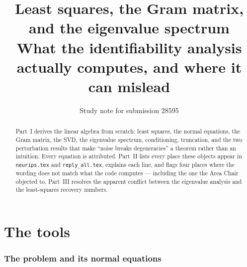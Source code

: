 \documentclass[11pt]{article}
\title{Least squares, the Gram matrix, and the eigenvalue spectrum\\
\large What the identifiability analysis actually computes, and where it can mislead}
\author{Study note for submission 28595}
\date{}
\begin{document}
\maketitle
\vspace{-2em}

\begin{abstract}
\noindent Part~I derives the linear algebra from scratch: least squares, the normal
equations, the Gram matrix, the SVD, the eigenvalue spectrum, conditioning,
truncation, and the two perturbation results that make ``noise breaks
degeneracies'' a theorem rather than an intuition. Every equation is attributed.
Part~II lists every place these objects appear in \texttt{neurips.tex} and
\texttt{reply\_all.tex}, explains each line, and flags four places where the
wording does not match what the code computes --- including the one the Area
Chair objected to. Part~III resolves the apparent conflict between the
eigenvalue analysis and the least-squares recovery numbers.
\end{abstract}

\part{The tools}

\section{The problem and its normal equations}
\end{document}
